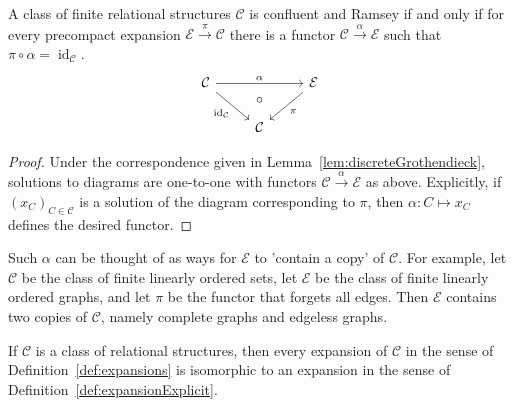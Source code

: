\documentclass[preprint,12pt]{elsarticle}
\newcommand{\cat}[1]{\mathcal{#1}}
\DeclareMathOperator{\id}{id}
\begin{document}
\begin{cor}
\label{cor:structures}
    A class of finite relational structures $\cat C$ is confluent and Ramsey if and only if for every precompact expansion $\cat E\xrightarrow{\pi}\cat C$ there is a functor $\cat C\xrightarrow{\alpha} \cat E$ such that $\pi\circ\alpha = \id_{\cat C}$.
    $$
    \begin{tikzcd}
    \cat C \arrow[rd, "\id_{\cat C}"'] \arrow[rr, "\alpha", ""name=iota] &        & \cat E \arrow[ld, "\pi"] \\
                                               & \cat C &      
    \arrow[to=2-2, from=iota, pos=.5, phantom, "\circ"]                    
    \end{tikzcd}
    $$
\end{cor}

\begin{proof}
    Under the correspondence given in Lemma~\ref{lem:discreteGrothendieck}, solutions to diagrams are one-to-one with functors $\cat C\xrightarrow{\alpha}\cat E$ as above. Explicitly, if $(x_C)_{C\in\cat C}$ is a solution of the diagram corresponding to $\pi$, then $\alpha:C\mapsto x_C$ defines the desired functor.
\end{proof}

\begin{exam}
    Such $\alpha$ can be thought of as ways for $\cat E$ to 'contain a copy' of $\cat C$. For example, let $\cat C$ be the class of finite linearly ordered sets, let $\cat E$ be the class of finite linearly ordered graphs, and let $\pi$ be the functor that forgets all edges. Then $\cat E$ contains two copies of $\cat C$, namely complete graphs and edgeless graphs.
\end{exam}

\begin{prop}
\label{prop:concrete expansions}
    If $\cat C$ is a class of relational structures, then every expansion of $\cat C$ in the sense of Definition~\ref{def:expansions} is isomorphic to an expansion in the sense of Definition~\ref{def:expansionExplicit}.
\end{prop}
\end{document}
